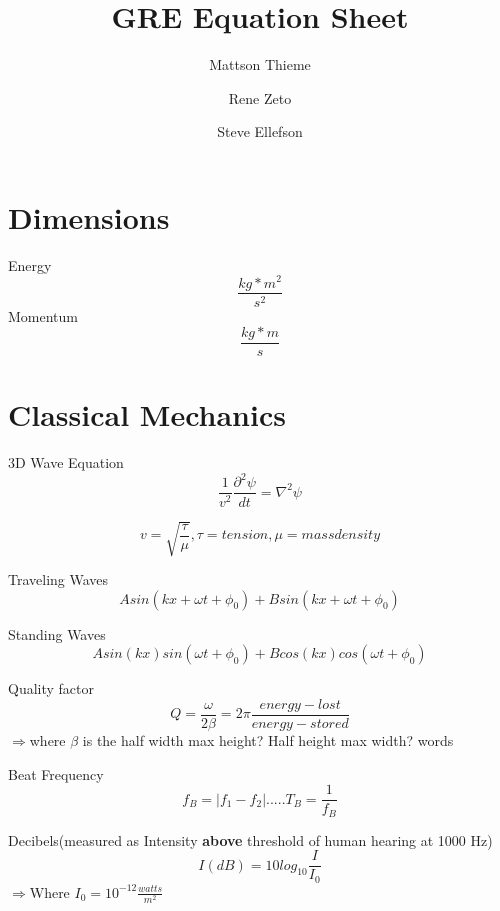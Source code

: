\documentclass{article}
\begin{document}
\title{GRE Equation Sheet}
\author{Mattson Thieme\and Rene Zeto \and Steve Ellefson}
\maketitle





\section{Dimensions}
Energy\begin{equation}\frac{kg*m^2}{s^2}
\end{equation} 
Momentum\begin{equation}\frac{kg*m}{s}\end{equation}






\section{Classical Mechanics}
3D Wave Equation\begin{equation}\frac{1}{v^2} \frac{\partial^2\psi}{dt}= \nabla^2 \psi \end{equation}

\begin{equation}v=\sqrt{\frac{\tau}{\mu}},  \tau=tension, \mu=mass density \end{equation}

Traveling Waves\begin{equation}Asin(kx+\omega t + \phi_0)+Bsin(kx+\omega t +\phi_0)\end{equation}

Standing Waves\begin{equation}Asin(kx)sin(\omega t+\phi_0)+Bcos(kx)cos(\omega t+\phi_0)\end{equation}

Quality factor\begin{equation}Q=\frac{\omega}{2\beta}=2\pi \frac{energy-lost}{energy-stored}\end{equation}
$\Rightarrow$where $\beta$ is the half width max height? Half height max width? words

Beat Frequency\begin{equation}f_B=|f_1-f_2|.....T_B = \frac{1}{f_B}\end{equation}

Decibels(measured as Intensity {\bf above} threshold of human hearing at 1000 Hz)\begin{equation}I(dB)=10log_{10}\frac{I}{I_0}\end{equation}
$\Rightarrow$Where $I_0 = 10^{-12} \frac{watts}{m^2}$
\end{document}
